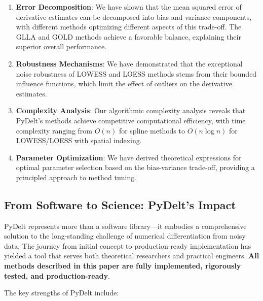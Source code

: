 \documentclass[10pt,journal,compsoc]{IEEEtran}
\begin{document}
\begin{enumerate}
    \item \textbf{Error Decomposition}: We have shown that the mean squared error of derivative estimates can be decomposed into bias and variance components, with different methods optimizing different aspects of this trade-off. The GLLA and GOLD methods achieve a favorable balance, explaining their superior overall performance.
    
    \item \textbf{Robustness Mechanisms}: We have demonstrated that the exceptional noise robustness of LOWESS and LOESS methods stems from their bounded influence functions, which limit the effect of outliers on the derivative estimates.
    
    \item \textbf{Complexity Analysis}: Our algorithmic complexity analysis reveals that PyDelt's methods achieve competitive computational efficiency, with time complexity ranging from $O(n)$ for spline methods to $O(n \log n)$ for LOWESS/LOESS with spatial indexing.
    
    \item \textbf{Parameter Optimization}: We have derived theoretical expressions for optimal parameter selection based on the bias-variance trade-off, providing a principled approach to method tuning.
\end{enumerate}

\subsection{From Software to Science: PyDelt's Impact}

PyDelt represents more than a software library---it embodies a comprehensive solution to the long-standing challenge of numerical differentiation from noisy data. The journey from initial concept to production-ready implementation has yielded a tool that serves both theoretical researchers and practical engineers. \textbf{All methods described in this paper are fully implemented, rigorously tested, and production-ready}.

The key strengths of PyDelt include:
\end{document}
